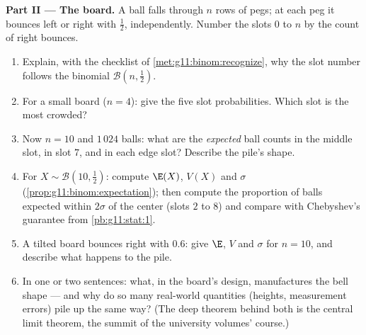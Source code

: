 \begin{problem}
\medskip
\noindent\textbf{Part II --- The board.}
A ball falls through $n$ rows of pegs; at each peg it bounces
left or right with  $\frac12$, independently. Number
the slots $0$ to $n$ by the count of right bounces.
\begin{enumerate}[resume]
  \item Explain, with the checklist of
        \cref{met:g11:binom:recognize}, why the slot number
        follows the binomial 
        $\mathcal B\!\left(n, \frac12\right)$.
  \item For a small board ($n = 4$): give the five slot
        probabilities. Which slot is the most crowded?
  \item Now $n = 10$ and $1\,024$ balls: what are the
        \emph{expected} ball counts in the middle slot, in slot
        $7$, and in each edge slot? Describe the pile's shape.
  \item For $X \sim \mathcal B\!\left(10, \frac12\right)$:
        compute $\E(X)$, $V(X)$ and $\sigma$
        (\cref{prop:g11:binom:expectation}); then compute the
        proportion of balls expected within $2\sigma$ of the
        center (slots $2$ to $8$) and compare with Chebyshev's
        guarantee from \cref{pb:g11:stat:1}.
  \item A tilted board bounces right with  $0.6$:
        give $\E$, $V$ and $\sigma$ for $n = 10$, and describe
        what happens to the pile.
  \item In one or two sentences: what, in the board's design,
        manufactures the bell shape --- and why do so many
        real-world quantities (heights, measurement errors)
        pile up the same way? (The deep theorem behind both is
        the central limit theorem, the summit of the university
        volumes'  course.)
\end{enumerate}


\end{problem}
